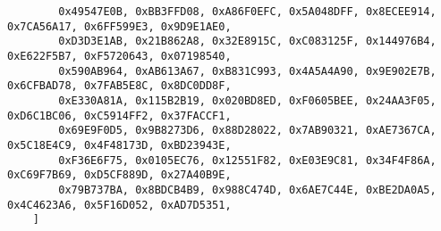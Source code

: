 \begin{samepage}
\begin{verbatim}
        0x49547E0B, 0xBB3FFD08, 0xA86F0EFC, 0x5A048DFF, 0x8ECEE914, 0x7CA56A17, 0x6FF599E3, 0x9D9E1AE0,
        0xD3D3E1AB, 0x21B862A8, 0x32E8915C, 0xC083125F, 0x144976B4, 0xE622F5B7, 0xF5720643, 0x07198540,
        0x590AB964, 0xAB613A67, 0xB831C993, 0x4A5A4A90, 0x9E902E7B, 0x6CFBAD78, 0x7FAB5E8C, 0x8DC0DD8F,
        0xE330A81A, 0x115B2B19, 0x020BD8ED, 0xF0605BEE, 0x24AA3F05, 0xD6C1BC06, 0xC5914FF2, 0x37FACCF1,
        0x69E9F0D5, 0x9B8273D6, 0x88D28022, 0x7AB90321, 0xAE7367CA, 0x5C18E4C9, 0x4F48173D, 0xBD23943E,
        0xF36E6F75, 0x0105EC76, 0x12551F82, 0xE03E9C81, 0x34F4F86A, 0xC69F7B69, 0xD5CF889D, 0x27A40B9E,
        0x79B737BA, 0x8BDCB4B9, 0x988C474D, 0x6AE7C44E, 0xBE2DA0A5, 0x4C4623A6, 0x5F16D052, 0xAD7D5351,
    ]
\end{verbatim}
\end{samepage}
